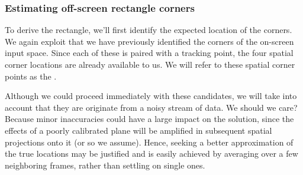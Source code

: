 

%



\subsubsection{Estimating off-screen rectangle corners}

To derive the rectangle, we'll first identify the expected location of the corners. We again exploit that we have previously identified the corners of the on-screen input space. Since each of these is paired with a tracking point, the  four spatial corner locations  are already available to us. We will refer to these spatial corner points as the .

\def\smoothCount{3}
Although we could proceed immediately with these candidates, we will take into account that they are originate from a noisy stream of data. We should we care? Because minor inaccuracies could have a large impact on the solution, since the effects of a poorly calibrated plane will be amplified in subsequent spatial projections onto it (or so we assume). Hence, seeking a better approximation of the true locations may be justified and is easily achieved by averaging over a few neighboring frames, rather than settling on single ones. 

